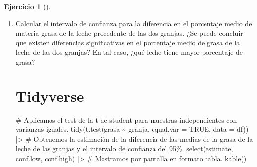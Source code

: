 \documentclass[
  a4paper,
]{scrreport}
\newenvironment{Shaded}{\begin{snugshade}}{\end{snugshade}}
\newcommand{\AttributeTok}[1]{\textcolor[rgb]{0.40,0.45,0.13}{#1}}
\newcommand{\CommentTok}[1]{\textcolor[rgb]{0.37,0.37,0.37}{#1}}
\newcommand{\ConstantTok}[1]{\textcolor[rgb]{0.56,0.35,0.01}{#1}}
\newcommand{\ExtensionTok}[1]{\textcolor[rgb]{0.00,0.23,0.31}{#1}}
\newcommand{\FunctionTok}[1]{\textcolor[rgb]{0.28,0.35,0.67}{#1}}
\newcommand{\NormalTok}[1]{\textcolor[rgb]{0.00,0.23,0.31}{#1}}
\newcommand{\PreprocessorTok}[1]{\textcolor[rgb]{0.68,0.00,0.00}{#1}}
\newcommand{\SpecialCharTok}[1]{\textcolor[rgb]{0.37,0.37,0.37}{#1}}
\theoremstyle{definition}
\newtheorem{exercise}{Ejercicio}[chapter]
\theoremstyle{remark}
\begin{document}
\begin{exercise}[]
\begin{enumerate}
\begin{tcolorbox}
\begin{Shaded}
\begin{Highlighting}[]
\ExtensionTok{Calcular}\NormalTok{ el intervalo de confianza para el cociente de varianzas del porcentaje de materia grasa de la leche procedente de ambas granjas con un nivel de confianza del 95\%.}

\ExtensionTok{Según}\NormalTok{ el intervalo de confianza, ¿existen diferencias estadísticamente significativas entre las varianzas de la grasa de las leches de las dos granjas}\PreprocessorTok{?}
\end{Highlighting}
\end{Shaded}

  Como el intervalo de confianza contiene el valor 1, no podemos afirmar
  que haya diferencias estadísticamente significativas entre las
  varianzas del porcentaje de materia grasa de las leches de las dos
  granjas, y por tanto podemos asumir que la variabilidad es parecida en
  ambas granjas.

  \end{tcolorbox}
\item
  Calcular el intervalo de confianza para la diferencia en el porcentaje
  medio de materia grasa de la leche procedente de las dos granjas. ¿Se
  puede concluir que existen diferencias significativas en el porcentaje
  medio de grasa de la leche de las dos granjas? En tal caso, ¿qué leche
  tiene mayor porcentaje de grasa?

  \begin{tcolorbox}[enhanced jigsaw, colframe=quarto-callout-tip-color-frame, toprule=.15mm, bottomtitle=1mm, breakable, opacitybacktitle=0.6, toptitle=1mm, colback=white, bottomrule=.15mm, title=\textcolor{quarto-callout-tip-color}{\faLightbulb}\hspace{0.5em}{Solución}, arc=.35mm, left=2mm, titlerule=0mm, rightrule=.15mm, coltitle=black, leftrule=.75mm, opacityback=0, colbacktitle=quarto-callout-tip-color!10!white]

  \section{Tidyverse}

\begin{Shaded}
\begin{Highlighting}[]
\CommentTok{\# Aplicamos el test de la t de student para muestras independientes con varianzas iguales.}
\FunctionTok{tidy}\NormalTok{(}\FunctionTok{t.test}\NormalTok{(grasa }\SpecialCharTok{\textasciitilde{}}\NormalTok{ granja, }\AttributeTok{equal.var =} \ConstantTok{TRUE}\NormalTok{, }\AttributeTok{data =}\NormalTok{ df)) }\SpecialCharTok{|\textgreater{}} 
\CommentTok{\# Obtenemos la estimación de la diferencia de las medias de la grasa de la leche de las granjas y el intervalo de confianza del 95\%.}
    \FunctionTok{select}\NormalTok{(estimate, conf.low, conf.high) }\SpecialCharTok{|\textgreater{}} 
    \CommentTok{\# Mostramos por pantalla en formato tabla.}
    \FunctionTok{kable}\NormalTok{()}
\end{Highlighting}
\end{Shaded}


\end{tcolorbox}
\end{enumerate}
\end{exercise}
\end{document}

